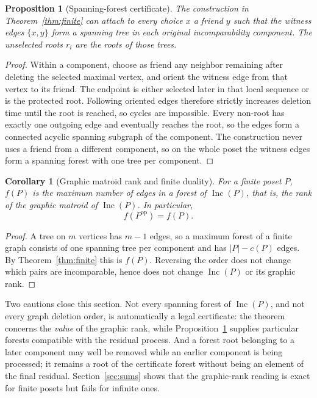 \documentclass[11pt,letterpaper]{article}
\newtheorem{proposition}[theorem]{Proposition}
\newtheorem{corollary}[theorem]{Corollary}
\theoremstyle{definition}
\theoremstyle{remark}
\newcommand{\Inc}{\operatorname{Inc}}
\begin{document}
\begin{proposition}[Spanning-forest certificate]\label{prop:forest}
The construction in Theorem~\ref{thm:finite} can attach to every choice $x$
a friend $y$ such that the witness edges $\{x,y\}$ form a spanning tree in
each original incomparability component. The unselected roots $r_i$ are the
roots of those trees.
\end{proposition}
\begin{proof}
Within a component, choose as friend any neighbor remaining after deleting
the selected maximal vertex, and orient the witness edge from that vertex to
its friend. The endpoint is either selected later in that local sequence or
is the protected root. Following oriented edges therefore strictly increases
deletion time until the root is reached, so cycles are impossible. Every
non-root has exactly one outgoing edge and eventually reaches the root, so
the edges form a connected acyclic spanning subgraph of the component. The
construction never uses a friend from a different component, so on the whole
poset the witness edges form a spanning forest with one tree per component.
\end{proof}

\begin{corollary}[Graphic matroid rank and finite duality]\label{cor:graphic}
For a finite poset $P$, $f(P)$ is the maximum number of edges in a forest of
$\Inc(P)$, that is, the rank of the graphic matroid of $\Inc(P)$. In
particular,
\[
 f(P^{\mathrm{op}})=f(P).
\]
\end{corollary}
\begin{proof}
A tree on $m$ vertices has $m-1$ edges, so a maximum forest of a finite
graph consists of one spanning tree per component and has $|P|-c(P)$ edges.
By Theorem~\ref{thm:finite} this is $f(P)$. Reversing the order does not
change which pairs are incomparable, hence does not change $\Inc(P)$ or its
graphic rank.
\end{proof}

Two cautions close this section. Not every spanning forest of $\Inc(P)$, and
not every graph deletion order, is automatically a legal certificate: the
theorem concerns the \emph{value} of the graphic rank, while
Proposition~\ref{prop:forest} supplies particular forests compatible with the
residual process. And a forest root belonging to a later component may well
be removed while an earlier component is being processed; it remains a root
of the certificate forest without being an element of the final residual.
Section~\ref{sec:sums} shows that the graphic-rank reading is exact for
finite posets but fails for infinite ones.
\end{document}

